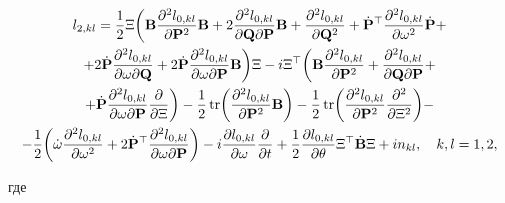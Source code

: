 \begin{multline*} 


l_{2,kl}=\frac{1}{2}\Xi\biggl(\BB 


\frac{\partial^2 l_{0,kl}}{\partial\BP^2}\BB+ 


2\frac{\partial^2 l_{0,kl}}{\partial\BQ\partial\BP}\BB+ 


\frac{\partial^2l_{0,kl}}{\partial\BQ^2}+ 


\Dot{\BP}^\top\frac{\partial^2 l_{0,kl}}{\partial\omega^2}\Dot{\BP}+ \\ 


%


+2\Dot{\BP}\frac{\partial^2l_{0,kl}}{\partial\omega\partial\BQ}+ 


2\Dot{\BP}\frac{\partial^2l_{0,kl}}{\partial\omega\partial\BP} 


\BB\biggr)\Xi-i\Xi^\top\biggl(\BB 


\frac{\partial^2l_{0,kl}}{\partial\BP^2}+ 


\frac{\partial^2l_{0,kl}}{\partial\BQ\partial\BP}+ \\ 


%


+\Dot{\BP}\frac{\partial^2l_{0,kl}}{\partial\omega\partial\BP} 


\frac{\partial}{\partial\Xi}\biggr)-\frac{1}{2}\tr\biggl( 


\frac{\partial^2l_{0,kl}}{\partial\BP^2}\BB\biggr)-\frac{1}{2}\tr 


\biggl(\frac{\partial^2l_{0,kl}}{\partial\BP^2} 


\frac{\partial^2}{\partial\Xi^2}\biggr)-\\ 


%


-\frac{1}{2}\biggl(\Dot\omega 


\frac{\partial^2l_{0,kl}}{\partial\omega^2}+2\Dot{\BP}^\top 


\frac{\partial^2l_{0,kl}}{\partial\omega\partial\BP}\biggr) 


-i\frac{\partial l_{0,kl}}{\partial\omega}\frac{\partial}{\partial t}+ 


\frac{1}{2}\frac{\partial l_{0,kl}}{\partial\theta} 


\Xi^\top\Dot{\BB}\Xi+in_{kl},\quad k,l=1,2, 


\end{multline*} 


где 



